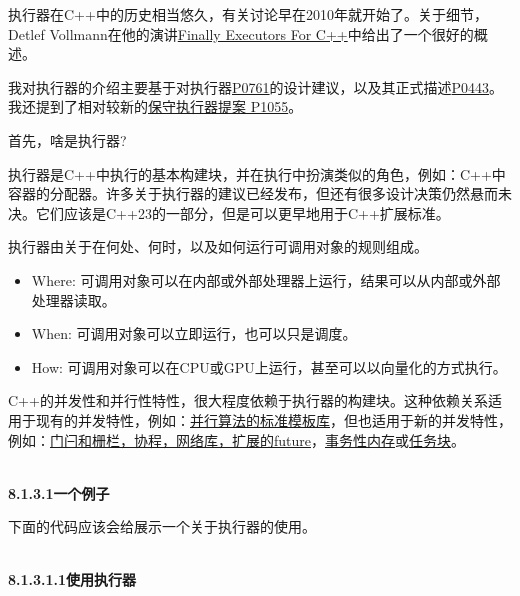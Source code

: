 执行器在C++中的历史相当悠久，有关讨论早在2010年就开始了。关于细节，Detlef Vollmann在他的演讲\href{http://www.vollmann.ch/en/presentations/executors2018.pdf}{Finally Executors For C++}中给出了一个很好的概述。

我对执行器的介绍主要基于对执行器\href{http://www.open-std.org/jtc1/sc22/wg21/docs/papers/2018/p0761r2.pdf}{P0761}的设计建议，以及其正式描述\href{http://open-std.org/JTC1/SC22/WG21/docs/papers/2018/p0443r7.html}{P0443}。我还提到了相对较新的\href{http://open-std.org/JTC1/SC22/WG21/docs/papers/2018/p1055r0.pdf}{保守执行器提案 P1055}。

首先，啥是执行器?

执行器是C++中执行的基本构建块，并在执行中扮演类似的角色，例如：C++中容器的分配器。许多关于执行器的建议已经发布，但还有很多设计决策仍然悬而未决。它们应该是C++23的一部分，但是可以更早地用于C++扩展标准。

执行器由关于在何处、何时，以及如何运行可调用对象的规则组成。

\begin{itemize}
\item 
Where: 可调用对象可以在内部或外部处理器上运行，结果可以从内部或外部处理器读取。

\item 
When: 可调用对象可以立即运行，也可以只是调度。

\item 
How: 可调用对象可以在CPU或GPU上运行，甚至可以以向量化的方式执行。
\end{itemize}

C++的并发性和并行性特性，很大程度依赖于执行器的构建块。这种依赖关系适用于现有的并发特性，例如：\href{https://www.modernescpp.com/index.php/parallel-algorithm-of-the-standard-template-library}{并行算法的标准模板库}，但也适用于新的并发特性，例如：\href{https://www.modernescpp.com/index.php/std-future-extensions}{门闩和栅栏，协程，网络库，扩展的future}，\href{https://www.modernescpp.com/index.php/transactional-memory}{事务性内存}或\href{https://www.modernescpp.com/index.php/task-blocks}{任务块}。

\hspace*{\fill} \\ %
\noindent
\textbf{8.1.3.1\hspace{0.2cm}一个例子}

下面的代码应该会给展示一个关于执行器的使用。

\hspace*{\fill} \\ %
\noindent
\textbf{8.1.3.1.1\hspace{0.2cm}使用执行器}

